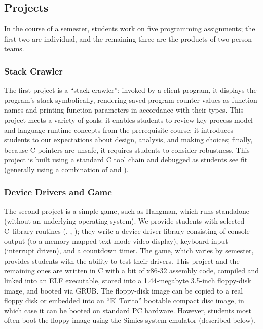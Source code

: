 \subsection{Projects}

In the course of a semester, students work on five
programming assignments; the first two are individual,
and the remaining three are the products of two-person
teams.

\subsubsection{Stack Crawler}
The first project is a ``stack crawler'':  invoked by
a client program, it displays the program's stack
symbolically, rendering saved program-counter values
as function names and printing function parameters
in accordance with their types.
This project meets a variety of goals:
it enables students to review key process-model and
language-runtime concepts from the
prerequisite course;
it introduces students to our expectations about
design, analysis, and making choices;
finally,
because C pointers are unsafe, it requires students
to consider robustness.
%
This project is built using a standard C tool chain
and debugged as students see fit (generally using
a combination of  and ).

\subsubsection{Device Drivers and Game}
The second project is a simple game, such as Hangman,
which runs standalone (without an underlying
operating system).
We provide students with selected C~library routines
(, , );
they write a device-driver library consisting of
console output (to a memory-mapped text-mode video display),
keyboard input (interrupt driven),
and a countdown timer.
The game, which varies by semester, provides students
with the ability to test their drivers.
%
%
This project and the remaining ones are written in
C with a bit of x86-32 assembly code,
compiled and linked into an ELF executable,
stored into a 1.44-megabyte 3.5-inch floppy-disk image,
and booted via GRUB.
The floppy-disk image can be copied to a real floppy disk
or embedded into an ``El Torito'' bootable compact disc image,
in which case it can be booted on standard PC hardware.
However, students most often boot the floppy image
using the Simics system emulator (described below).

